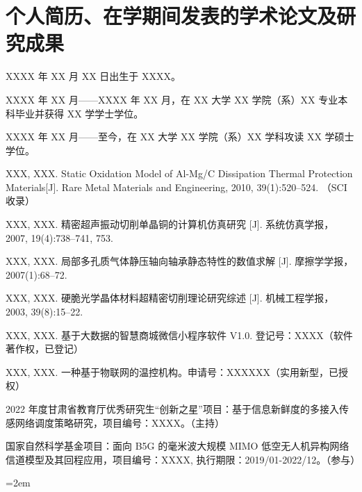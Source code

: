 \chapter*{个人简历、在学期间发表的学术论文及研究成果}
\setlength{\parindent}{0pt}
\vspace*{0.3em}
\begin{publist}
	\item XXXX 年 XX 月 XX 日出生于 XXXX。
	\item XXXX 年 XX 月——XXXX 年 XX 月，在 XX 大学 XX 学院（系）XX 专业本科毕业并获得 XX 学学士学位。
	\item XXXX 年 XX 月——至今，在 XX 大学 XX 学院（系）XX 学科攻读 XX 学硕士学位。
\end{publist}

\vspace*{0.3em}
\begin{publist}
	\item XXX, XXX. Static Oxidation Model of Al-Mg/C Dissipation Thermal Protection Materials[J]. Rare Metal Materials and Engineering, 2010, 39(1):520–524. （SCI 收录）
	\item XXX, XXX. 精密超声振动切削单晶铜的计算机仿真研究 [J]. 系统仿真学报，2007, 19(4):738–741, 753.
	\item XXX, XXX. 局部多孔质气体静压轴向轴承静态特性的数值求解 [J]. 摩擦学学报，2007(1):68–72.
    \item XXX, XXX. 硬脆光学晶体材料超精密切削理论研究综述 [J]. 机械工程学报，2003, 39(8):15–22.
\end{publist}
\vspace*{1em}
\vspace*{0.3em}
\begin{publist}
   \item XXX, XXX. 基于大数据的智慧商城微信小程序软件 V1.0. 登记号：XXXX（软件著作权，已登记）
   \item XXX, XXX. 一种基于物联网的温控机构。申请号：XXXXXX（实用新型，已授权）
\end{publist}
\vspace*{1em}
\vspace*{0.3em}
\begin{publist}
	\item	2022 年度甘肃省教育厅优秀研究生“创新之星”项目：基于信息新鲜度的多接入传感网络调度策略研究，项目编号：XXXX。（主持）
	\item	国家自然科学基金项目：面向 B5G 的毫米波大规模 MIMO 低空无人机异构网络信道模型及其回程应用，项目编号：XXXX, 执行期限：2019/01-2022/12。（参与）
\end{publist}
{}\hangindent=2em\noindent
